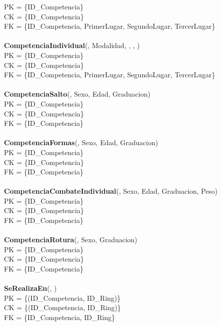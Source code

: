 PK = \{ID\_Competencia\}\\
CK = \{ID\_Competencia\}\\
FK = \{ID\_Competencia, PrimerLugar, SegundoLugar, TercerLugar\}\\
\\
\textbf{CompetenciaIndividual}(, Modalidad, , , )\\
PK = \{ID\_Competencia\}\\
CK = \{ID\_Competencia\}\\
FK = \{ID\_Competencia, PrimerLugar, SegundoLugar, TercerLugar\}\\
\\
\textbf{CompetenciaSalto}(, Sexo, Edad, Graduacion)\\
PK = \{ID\_Competencia\}\\
CK = \{ID\_Competencia\}\\
FK = \{ID\_Competencia\}\\
\\
\textbf{CompetenciaFormas}(, Sexo, Edad, Graduacion)\\
PK = \{ID\_Competencia\}\\
CK = \{ID\_Competencia\}\\
FK = \{ID\_Competencia\}\\
\\
\textbf{CompetenciaCombateIndividual}(, Sexo, Edad, Graduacion, Peso)\\
PK = \{ID\_Competencia\}\\
CK = \{ID\_Competencia\}\\
FK = \{ID\_Competencia\}\\
\\
\textbf{CompetenciaRotura}(, Sexo, Graduacion)\\
PK = \{ID\_Competencia\}\\
CK = \{ID\_Competencia\}\\
FK = \{ID\_Competencia\}\\
\\
\textbf{SeRealizaEn}(, )\\
PK = \{(ID\_Competencia, ID\_Ring)\}\\
CK = \{(ID\_Competencia, ID\_Ring)\}\\
FK = \{ID\_Competencia, ID\_Ring\}\\
